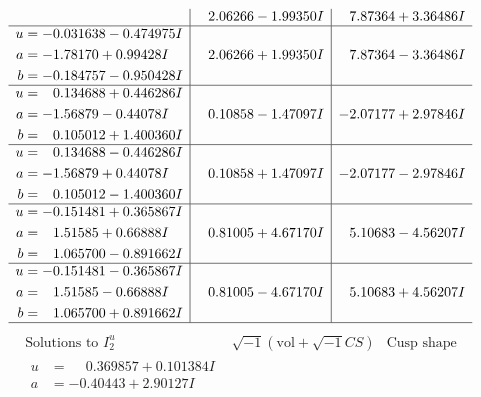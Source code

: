 \documentclass[1p]{elsarticle_modified}
\theoremstyle{definition}
\newcommand{\I}{\sqrt{-1}}
\begin{document}
$$\begin{array}{c|c|c}
 & \phantom{-}2.06266 - 1.99350 I & \phantom{-}7.87364 + 3.36486 I \\ \hline\begin{aligned}
u &= -0.031638 - 0.474975 I \\
a &= -1.78170 + 0.99428 I \\
b &= -0.184757 - 0.950428 I\end{aligned}
 & \phantom{-}2.06266 + 1.99350 I & \phantom{-}7.87364 - 3.36486 I \\ \hline\begin{aligned}
u &= \phantom{-}0.134688 + 0.446286 I \\
a &= -1.56879 - 0.44078 I \\
b &= \phantom{-}0.105012 + 1.400360 I\end{aligned}
 & \phantom{-}0.10858 - 1.47097 I & -2.07177 + 2.97846 I \\ \hline\begin{aligned}
u &= \phantom{-}0.134688 - 0.446286 I \\
a &= -1.56879 + 0.44078 I \\
b &= \phantom{-}0.105012 - 1.400360 I\end{aligned}
 & \phantom{-}0.10858 + 1.47097 I & -2.07177 - 2.97846 I \\ \hline\begin{aligned}
u &= -0.151481 + 0.365867 I \\
a &= \phantom{-}1.51585 + 0.66888 I \\
b &= \phantom{-}1.065700 - 0.891662 I\end{aligned}
 & \phantom{-}0.81005 + 4.67170 I & \phantom{-}5.10683 - 4.56207 I \\ \hline\begin{aligned}
u &= -0.151481 - 0.365867 I \\
a &= \phantom{-}1.51585 - 0.66888 I \\
b &= \phantom{-}1.065700 + 0.891662 I\end{aligned}
 & \phantom{-}0.81005 - 4.67170 I & \phantom{-}5.10683 + 4.56207 I\\
 \hline 
 \end{array}$$\newpage$$\begin{array}{c|c|c}  
\text{Solutions to }I^u_{2}& \I (\text{vol} + \sqrt{-1}CS) & \text{Cusp shape}\\
 \hline 
\begin{aligned}
u &= \phantom{-}0.369857 + 0.101384 I \\
a &= -0.40443 + 2.90127 I \\

\end{aligned}
\end{array}$$
\end{document}
